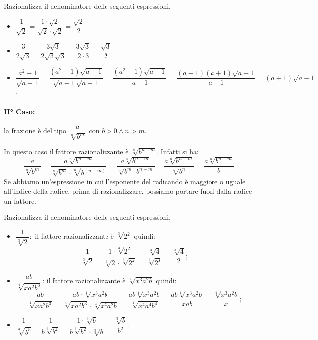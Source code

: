 \begin{exrig}
 \begin{esempio}
Razionalizza il denominatore delle seguenti espressioni.
\begin{itemize}
 \item $\dfrac 1{\sqrt 2}=\dfrac{1\cdot \sqrt 2}{\sqrt 2\cdot \sqrt 2}=
        \dfrac{\sqrt 2} 2$
 \item $\dfrac 3{2\sqrt 3}=\dfrac{3\sqrt 3}{2\sqrt 3\sqrt 3}=
        \dfrac{3\sqrt 3}{2\cdot 3}=\dfrac{\sqrt 3} 2$
 \item $\dfrac{a^2-1}{\sqrt{a-1}}=
        \dfrac{(a^2-1)\sqrt{a-1}}{\sqrt{a-1}\sqrt{a-1}}=
        \dfrac{(a^2-1)\sqrt{a-1}}{a-1}=
        \dfrac{(a-1)(a+1)\sqrt{a-1}}{a-1}=(a+1)\sqrt{a-1}$.
\end{itemize}
 \end{esempio}
\end{exrig}

\paragraph{II° Caso:}
 la frazione è del tipo $\dfrac a{\sqrt[n]{b^m}}$ con $b>0 \wedge n>m$.

In questo caso il fattore razionalizzante è $\sqrt[n]{b^{n-m}}$. Infatti si ha:
\begin{equation*}
\dfrac a{\sqrt[n]{b^m}}=
\dfrac{a\sqrt[n]{b^{n-m}}}{\sqrt[n]{b^m}\cdot \sqrt[n]{b^{(n-m)}}}=
\dfrac{a\sqrt[n]{b^{n-m}}}{\sqrt[n]{b^m\cdot b^{n-m}}}=
\dfrac{a\sqrt[n]{b^{n-m}}}{\sqrt[n]{b^n}}=\dfrac{a\sqrt[n]{b^{n-m}}} b
\end{equation*}
Se abbiamo un'espressione in cui l'esponente del radicando è maggiore o uguale 
all'indice della radice, prima di razionalizzare, possiamo portare fuori dalla 
radice un fattore.

\begin{exrig}
 \begin{esempio}
Razionalizza il denominatore delle seguenti espressioni.
\begin{itemize}
 \item $\dfrac 1{\sqrt[3]2}$:\, il fattore razionalizzante è $\sqrt[3]{2^2}$ 
  quindi:
  \[\dfrac 1{\sqrt[3]2}=
  \dfrac{1\cdot \sqrt[3]{2^2}}{\sqrt[3]2\cdot \sqrt[3]{2^2}}=
  \dfrac{\sqrt[3]4}{\sqrt[3]{2^3}}=\dfrac{\sqrt[3]4} 2;\]
 \item $\dfrac{ab}{\sqrt[4]{xa^2b^3}}$:
 il fattore razionalizzante è $\sqrt[4]{x^3a^2b}$
 quindi: 
 \[\dfrac{ab}{\sqrt[4]{xa^2b^3}}=
 \dfrac{ab\cdot \sqrt[4]{x^3a^2b}}{\sqrt[4]{xa^2b^3}\cdot \sqrt[4]{x^3a^2b}}=
 \dfrac{ab\sqrt[4]{x^3a^2b}}{\sqrt[4]{x^4a^4b^4}}=
 \dfrac{ab\sqrt[4]{x^3a^2b}}{xab}=\dfrac{\sqrt[4]{x^3a^2b}} x;\]
 \item $\dfrac 1{\sqrt[3]{b^5}}=\dfrac 1{b\sqrt[3]{b^2}}=
        \dfrac{1\cdot \sqrt[3]b}{b\sqrt[3]{b^2}\cdot \sqrt[3]b}=
        \dfrac{\sqrt[3]b}{b^2}$.
\end{itemize}
 \end{esempio}
\end{exrig}


